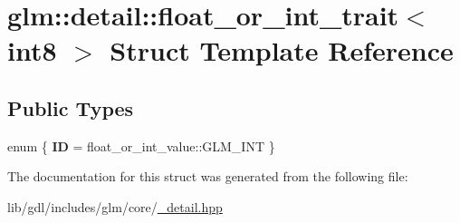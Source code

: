 \hypertarget{structglm_1_1detail_1_1float__or__int__trait_3_01int8_01_4}{}\section{glm\+:\+:detail\+:\+:float\+\_\+or\+\_\+int\+\_\+trait$<$ int8 $>$ Struct Template Reference}
\label{structglm_1_1detail_1_1float__or__int__trait_3_01int8_01_4}
\subsection*{Public Types}
\begin{DoxyCompactItemize}
\item 
\hypertarget{structglm_1_1detail_1_1float__or__int__trait_3_01int8_01_4_a8b6da070db78a5aa7ba60b8052e967ab}{}enum \{ {\bfseries I\+D} = float\+\_\+or\+\_\+int\+\_\+value\+:\+:G\+L\+M\+\_\+\+I\+N\+T
 \}\label{structglm_1_1detail_1_1float__or__int__trait_3_01int8_01_4_a8b6da070db78a5aa7ba60b8052e967ab}

\end{DoxyCompactItemize}


The documentation for this struct was generated from the following file\+:\begin{DoxyCompactItemize}
\item 
lib/gdl/includes/glm/core/\hyperlink{__detail_8hpp}{\+\_\+detail.\+hpp}\end{DoxyCompactItemize}
